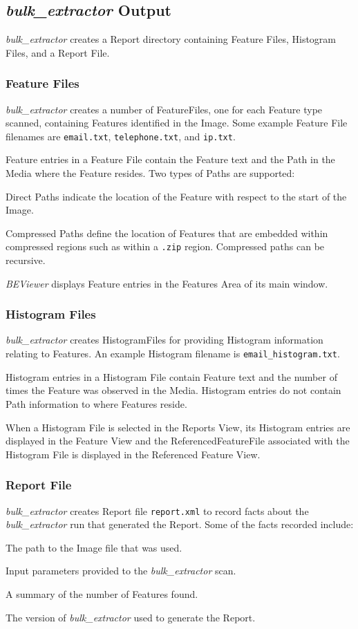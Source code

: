 \documentclass[10pt,twoside]{article}
\newcommand{\bulk}{\emph{bulk\_extractor}\xspace}
\newcommand{\bev}{\emph{BEViewer}\xspace}
\begin{document}
\subsection{\bulk Output\label{bulk-extractor-output}}
\bulk creates a Report directory containing Feature Files, Histogram Files, and a Report File.
\subsubsection{Feature Files}
\bulk creates a number of \glspl{FeatureFile}, one for each Feature type scanned,
containing Features identified in the Image.
Some example Feature File filenames are
\texttt{email.txt}, \texttt{telephone.txt}, and \texttt{ip.txt}.

Feature entries in a Feature File contain the Feature text and the \gls{Path} in the Media
where the Feature resides.
Two types of Paths are supported:
\begin{compactitem}
\item Direct Paths indicate the location of the Feature
with respect to the start of the Image.
\item Compressed Paths define the location of Features
that are embedded within compressed regions such as within a \texttt{.zip} region.
Compressed paths can be recursive.
\end{compactitem}

\bev displays Feature entries in the Features Area of its main window.

\subsubsection{Histogram Files}
\bulk creates \glspl{HistogramFile} for providing \gls{Histogram} information
relating to Features.
An example Histogram filename is \texttt{email\_histogram.txt}.

Histogram entries in a Histogram File contain Feature text and the number of times
the Feature was observed in the Media.
Histogram entries do not contain Path information to where Features reside.

When a Histogram File is selected in the Reports View,
its Histogram entries are displayed in the Feature View
and the \gls{ReferencedFeatureFile} associated with the Histogram File
is displayed in the Referenced Feature View.

\subsubsection{Report File}
\bulk creates \gls{Report} file \texttt{report.xml}
to record facts about the \bulk run that generated the Report.
Some of the facts recorded include:
\begin{compactitem}
\item The path to the Image file that was used.
\item Input parameters provided to the \bulk scan.
\item A summary of the number of Features found.
\item The version of \bulk used to generate the Report.
\end{compactitem}
\end{document}
